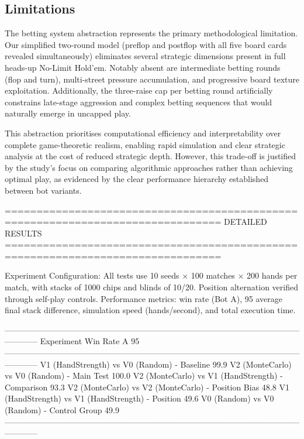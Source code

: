 \subsection{Limitations}

The betting system abstraction represents the primary methodological limitation. Our simplified two-round model (preflop and postflop with all five board cards revealed simultaneously) eliminates several strategic dimensions present in full heads-up No-Limit Hold'em. Notably absent are intermediate betting rounds (flop and turn), multi-street pressure accumulation, and progressive board texture exploitation. Additionally, the three-raise cap per betting round artificially constrains late-stage aggression and complex betting sequences that would naturally emerge in uncapped play.

This abstraction prioritises computational efficiency and interpretability over complete game-theoretic realism, enabling rapid simulation and clear strategic analysis at the cost of reduced strategic depth. However, this trade-off is justified by the study's focus on comparing algorithmic approaches rather than achieving optimal play, as evidenced by the clear performance hierarchy established between bot variants.

================================================================================
DETAILED RESULTS
================================================================================

Experiment Configuration: All tests use 10 seeds × 100 matches × 200 hands per match,
with stacks of 1000 chips and blinds of 10/20. Position alternation verified through
self-play controls. Performance metrics: win rate (Bot A), 95%
average final stack difference, simulation speed (hands/second), and total execution time.

------------------------------------------------------------------------------------------------------------------------
Experiment                                         Win Rate A   95%
------------------------------------------------------------------------------------------------------------------------
V1 (HandStrength) vs V0 (Random) - Baseline         99.9%
V2 (MonteCarlo) vs V0 (Random) - Main Test         100.0%
V2 (MonteCarlo) vs V1 (HandStrength) - Comparison    93.3%
V2 (MonteCarlo) vs V2 (MonteCarlo) - Position Bias   48.8%
V1 (HandStrength) vs V1 (HandStrength) - Position    49.6%
V0 (Random) vs V0 (Random) - Control Group           49.9%
------------------------------------------------------------------------------------------------------------------------

